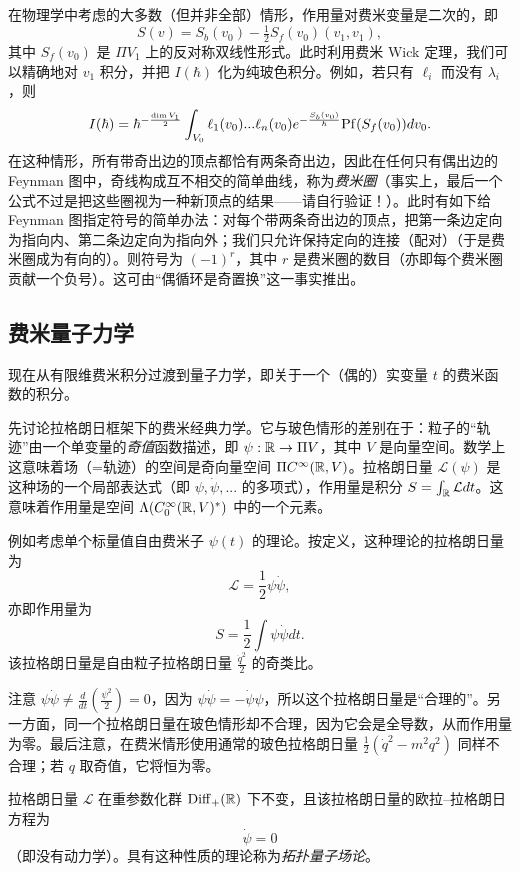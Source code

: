 在物理学中考虑的大多数（但并非全部）情形，作用量对费米变量是二次的，即
$$
S(v)=S_b(v_0)-\tfrac{1}{2}S_f(v_0)(v_1,v_1),
$$
其中 $S_f(v_0)$ 是 $\Pi V_1$ 上的反对称双线性形式。此时利用费米 Wick 定理，我们可以精确地对 $v_1$ 积分，并把 $I(\hbar)$ 化为纯玻色积分。例如，若只有 $\ell_i$ 而没有 $\lambda_i$，则
$$
I(\hbar)=\hbar^{-\frac{\dim V_1}{2}}\int_{V_0}\ell_1(v_0)...\ell_n(v_0)e^{-\frac{S_b(v_0)}{\hbar}}
{\rm Pf}(S_f(v_0))dv_0.
$$
在这种情形，所有带奇出边的顶点都恰有两条奇出边，因此在任何只有偶出边的 Feynman 图中，奇线构成互不相交的简单曲线，称为\emph{费米圈}（事实上，最后一个公式不过是把这些圈视为一种新顶点的结果——请自行验证！）。此时有如下给 Feynman 图指定符号的简单办法：对每个带两条奇出边的顶点，把第一条边定向为指向内、第二条边定向为指向外；我们只允许保持定向的连接（配对）（于是费米圈成为有向的）。则符号为 $(-1)^r$，其中 $r$ 是费米圈的数目（亦即每个费米圈贡献一个负号）。这可由“偶循环是奇置换”这一事实推出。

\subsection{费米量子力学} \label{fqm}

现在从有限维费米积分过渡到量子力学，即关于一个（偶的）实变量 $t$ 的费米函数的积分。

先讨论拉格朗日框架下的费米经典力学。它与玻色情形的差别在于：粒子的“轨迹”由一个单变量的\emph{奇值}函数描述，即 $\psi: \Bbb R\to \Pi V$，其中 $V$ 是向量空间。数学上这意味着场（=轨迹）的空间是奇向量空间 $\Pi C^\infty(\Bbb R,V)$。拉格朗日量 ${\mathcal L}(\psi)$ 是这种场的一个局部表达式（即 $\psi,\dot{\psi},...$ 的多项式），作用量是积分 $S=\int_{\Bbb R}{\mathcal L}dt$。这意味着作用量是空间 $\Lambda (C^\infty_0(\Bbb R,V)^*)$ 中的一个元素。

例如考虑单个标量值自由费米子 $\psi(t)$ 的理论。按定义，这种理论的拉格朗日量为
$$
{\mathcal L}=\frac{1}{2}
\psi\dot{\psi},
$$
亦即作用量为
$$
S=
\frac{1}{2}\int \psi\dot{\psi} dt.
$$
该拉格朗日量是自由粒子拉格朗日量 $\frac{\dot{q}^2}{2}$ 的奇类比。

\begin{remark} 注意 $\psi\dot{\psi}\ne \frac{d}{dt}(\frac{\psi^2}{2})=0$，因为 $\psi\dot{\psi}=-\dot{\psi}\psi$，所以这个拉格朗日量是“合理的”。另一方面，同一个拉格朗日量在玻色情形却不合理，因为它会是全导数，从而作用量为零。最后注意，在费米情形使用通常的玻色拉格朗日量 $\frac{1}{2}(\dot{q}^2-m^2q^2)$ 同样不合理；若 $q$ 取奇值，它将恒为零。
\end{remark}

拉格朗日量 ${\mathcal L}$ 在重参数化群 ${\rm Diff}_+(\Bbb R)$ 下不变，且该拉格朗日量的欧拉–拉格朗日方程为
$$
\dot{\psi}=0
$$
（即没有动力学）。具有这种性质的理论称为\emph{拓扑量子场论}。

